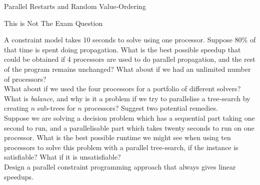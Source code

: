 \documentclass{beamer}
\begin{document}
\begin{frame}{Parallel Restarts and Random Value-Ordering}
\end{frame}

\begin{frame}{This is Not The Exam Question}

    \scriptsize

    A constraint model takes 10 seconds to solve using one processor. Suppose 80\% of that time is
    spent doing propagation. What is the best possible speedup that could be obtained if 4
    processors are used to do parallel propagation, and the rest of the program remains
    unchanged? What about if we had an unlimited number of processors?
    \\[0.5cm]

    What about if we used the four processors for a portfolio of different solvers? \\[0.5cm]

    What is \emph{balance}, and why is it a problem if we try to parallelise a tree-search by
    creating $n$ sub-trees for $n$ processors? Suggest two potential remedies. \\[0.5cm]

    Suppose we are solving a decision problem which has a sequential part taking
    one second to run, and a parallelisable part which takes twenty seconds to run on one
    processor. What is the best possible runtime we might see when using ten processors to
    solve this problem with a parallel tree-search, if the instance is satisfiable? What if
    it is unsatisfiable? \\[0.5cm]

    Design a parallel constraint programming approach that always gives linear speedups.

\end{frame}
\end{document}
